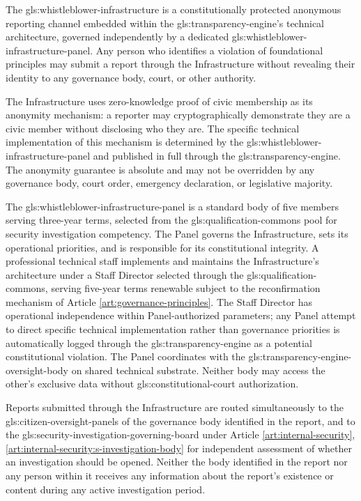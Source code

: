 The \gls{gls:whistleblower-infrastructure} is a constitutionally protected anonymous reporting channel embedded within the \gls{gls:transparency-engine}'s technical architecture, governed independently by a dedicated \gls{gls:whistleblower-infrastructure-panel}. Any person who identifies a violation of foundational principles may submit a report through the Infrastructure without revealing their identity to any governance body, court, or other authority.

The Infrastructure uses zero-knowledge proof of civic membership as its anonymity mechanism: a reporter may cryptographically demonstrate they are a civic member without disclosing who they are. The specific technical implementation of this mechanism is determined by the \gls{gls:whistleblower-infrastructure-panel} and published in full through the \gls{gls:transparency-engine}. The anonymity guarantee is absolute and may not be overridden by any governance body, court order, emergency declaration, or legislative majority.

The \gls{gls:whistleblower-infrastructure-panel} is a standard body of five members serving three-year terms, selected from the \gls{gls:qualification-commons} pool for security investigation competency. The Panel governs the Infrastructure, sets its operational priorities, and is responsible for its constitutional integrity. A professional technical staff implements and maintains the Infrastructure's architecture under a Staff Director selected through the \gls{gls:qualification-commons}, serving five-year terms renewable subject to the reconfirmation mechanism of Article \ref{art:governance-principles}. The Staff Director has operational independence within Panel-authorized parameters; any Panel attempt to direct specific technical implementation rather than governance priorities is automatically logged through the \gls{gls:transparency-engine} as a potential constitutional violation. The Panel coordinates with the \gls{gls:transparency-engine-oversight-body} on shared technical substrate. Neither body may access the other's exclusive data without \gls{gls:constitutional-court} authorization.

Reports submitted through the Infrastructure are routed simultaneously to the \gls{gls:citizen-oversight-panels} of the governance body identified in the report, and to the \gls{gls:security-investigation-governing-board} under Article \ref{art:internal-security}, \ref{art:internal-security:s-investigation-body} for independent assessment of whether an investigation should be opened. Neither the body identified in the report nor any person within it receives any information about the report's existence or content during any active investigation period.

